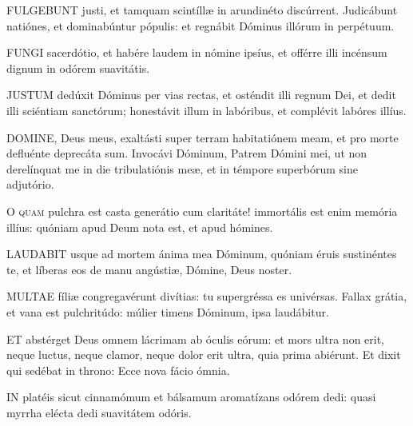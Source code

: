 
\lettrine[lines=2]{F}{ULGEBUNT} justi, et tamquam scintíllæ in arundinéto discúrrent. Judicábunt natiónes, et dominabúntur pópulis: et regnábit Dóminus illórum in perpétuum.


\lettrine[lines=2]{F}{UNGI} sacerdótio, et habére laudem in nómine ipsíus, et offérre illi incénsum dignum in odórem suavitátis.


\lettrine[lines=2]{J}{USTUM} dedúxit Dóminus per vias rectas, et osténdit illi regnum Dei, et dedit illi sciéntiam sanctórum; honestávit illum in labóribus, et complévit labóres illíus.


\lettrine[lines=2]{D}{OMINE}, Deus meus, exaltásti super terram habitatiónem meam, et pro morte defluénte deprecáta sum. Invocávi Dóminum, Patrem Dómini mei, ut non derelínquat me in die tribulatiónis meæ, et in témpore superbórum sine adjutório.


\lettrine[lines=2]{O}{} \textsc{quam} pulchra est casta generátio cum claritáte! immortális est enim memória illíus: quóniam apud Deum nota est, et apud hómines.


\lettrine[lines=2]{L}{AUDABIT} usque ad mortem ánima mea Dóminum, quóniam éruis sustinéntes te, et líberas eos de manu angústiæ, Dómine, Deus noster.


\lettrine[lines=2]{M}{ULTAE} fíliæ congregavérunt divítias: tu supergréssa es univérsas. Fallax grátia, et vana est pulchritúdo: múlier timens Dóminum, ipsa laudábitur.


\lettrine[lines=2]{E}{T} abstérget Deus omnem lácrimam ab óculis eórum: et mors ultra non erit, neque luctus, neque clamor, neque dolor erit ultra, quia prima abiérunt. Et dixit qui sedébat in throno: Ecce nova fácio ómnia.


\lettrine[lines=2]{I}{N} platéis sicut cinnamómum et bálsamum aromatízans odórem dedi: quasi myrrha elécta dedi suavitátem odóris.

